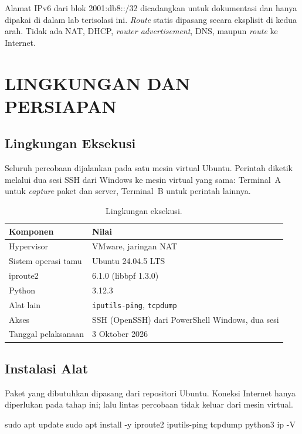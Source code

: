 \documentclass[12pt,a4paper]{report}
\newcommand{\hdr}[1]{\cellcolor{hijauhdr}\textbf{#1}}
\newcommand{\kode}[1]{\texttt{\small #1}}
\begin{document}
Alamat IPv6 dari blok 2001:db8::/32 dicadangkan untuk dokumentasi dan hanya dipakai di dalam lab terisolasi ini. \emph{Route} statis dipasang secara eksplisit di kedua arah. Tidak ada NAT, DHCP, \emph{router advertisement}, DNS, maupun \emph{route} ke Internet.

\chapter{LINGKUNGAN DAN PERSIAPAN}

\section{Lingkungan Eksekusi}
Seluruh percobaan dijalankan pada satu mesin virtual Ubuntu. Perintah diketik melalui dua sesi SSH dari Windows ke mesin virtual yang sama: Terminal~A untuk \emph{capture} paket dan server, Terminal~B untuk perintah lainnya.

\begin{table}[H]
\centering
\small
\begin{tabular}{|L{4.2cm}|L{9.6cm}|}
\hline
\hdr{Komponen} & \hdr{Nilai} \\ \hline
Hypervisor & VMware, jaringan NAT \\ \hline
Sistem operasi tamu & Ubuntu 24.04.5 LTS \\ \hline
iproute2 & 6.1.0 (libbpf 1.3.0) \\ \hline
Python & 3.12.3 \\ \hline
Alat lain & \kode{iputils-ping}, \kode{tcpdump} \\ \hline
Akses & SSH (OpenSSH) dari PowerShell Windows, dua sesi \\ \hline
Tanggal pelaksanaan & 3 Oktober 2026 \\ \hline
\end{tabular}
\caption{Lingkungan eksekusi.}
\label{tab:lingkungan}
\end{table}

\section{Instalasi Alat}
Paket yang dibutuhkan dipasang dari repositori Ubuntu. Koneksi Internet hanya diperlukan pada tahap ini; lalu lintas percobaan tidak keluar dari mesin virtual.

\begin{cmd}
sudo apt update
sudo apt install -y iproute2 iputils-ping tcpdump python3
ip -V
\end{cmd}
\end{document}
